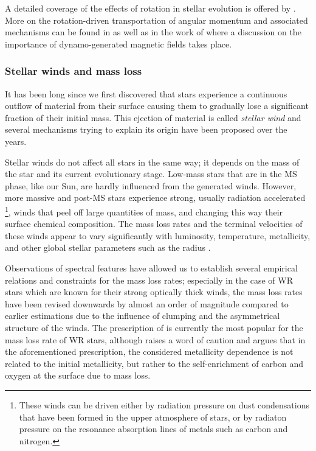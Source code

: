 \documentclass[../../main/thesis_msc.tex]{subfiles}
\begin{document}
						A detailed coverage of the effects of rotation in stellar evolution is offered by \cite{Langer1997, Heger2000, Hirschi, Maeder2006, langer12, Palacios}. More on the rotation-driven transportation of angular momentum and associated mechanisms can be found in \cite{Heger2005, langer12} as well as in the work of \cite{Spruit2002} where a discussion on the importance of dynamo-generated magnetic fields takes place.
						
						
						
						
					\subsubsection{Stellar winds and mass loss}
					
						It has been long since we first discovered that stars experience a continuous outflow of material from their surface causing them to gradually lose a significant fraction of their initial mass. This ejection of material is called \emph{stellar wind} and several mechanisms trying to explain its origin have been proposed over the years.
						
						Stellar winds do not affect all stars in the same way; it depends on the mass of the star and its current evolutionary stage. Low-mass stars that are in the MS phase, like our Sun, are hardly influenced from the generated winds. However, more massive and post-MS stars experience strong, usually radiation accelerated \footnote{These winds can be driven either by radiation pressure on dust condensations that have been formed in the upper atmosphere of stars, or by radiaton pressure on the resonance absorption lines of metals such as carbon and nitrogen.}, winds that peel off large quantities of mass, and changing this way their surface chemical composition. The mass loss rates and the terminal velocities of these winds appear to vary significantly with luminosity, temperature, metallicity, and other global stellar parameters such as the radius \citep{Hamann1982, deJager1988, Nugis2000, yoon17}.
						
						Observations of spectral features have allowed us to establish several empirical relations and constraints for the mass loss rates; especially in the case of WR stars which are known for their strong optically thick winds, the mass loss rates have been revised downwards by almost an order of magnitude \citep{Nugis2000} compared to earlier estimations \citep{Hamann1995, Langer1989} due to the influence of clumping and the asymmetrical structure of the winds. The prescription of \cite{Nugis2000} is currently the most popular for the mass loss rate of WR stars, although \cite{yoon17} raises a word of caution and argues that in the aforementioned prescription, the considered metallicity dependence is not related to the initial metallicity, but rather to the self-enrichment of carbon and oxygen at the surface due to mass loss.
						
\end{document}
